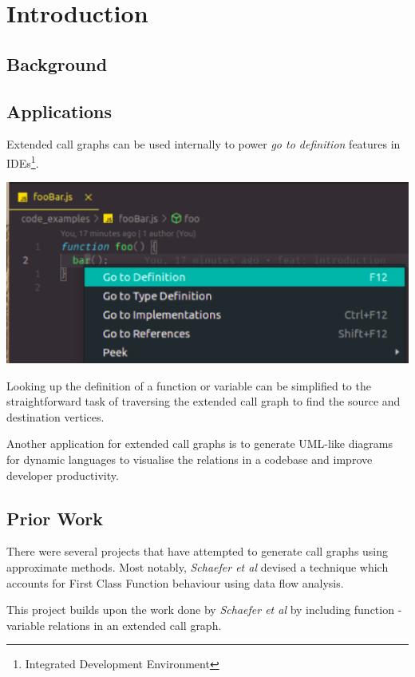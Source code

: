 \chapter{Introduction}

\section{Background}







\section{Applications}

Extended call graphs can be used internally to power \textit{go to definition} features in IDEs\footnote{Integrated Development Environment}.

\begin{center}
    \includegraphics[width=1\textwidth]{./images/goto_def.eps}
\end{center}

Looking up the definition of a function or variable can be simplified to the straightforward task of traversing the extended call graph to find the source and destination vertices.

Another application for extended call graphs is to generate UML-like\parencite{uml} diagrams for dynamic languages to visualise the relations in a codebase and improve developer productivity.

\section{Prior Work}

There were several projects that have attempted to generate call graphs using approximate methods. Most notably, \textit{Schaefer et al}\parencite{schaefer} devised a technique which accounts for First Class Function behaviour using data flow analysis. 

This project builds upon the work done by \textit{Schaefer et al} by including function - variable relations in an extended call graph.
